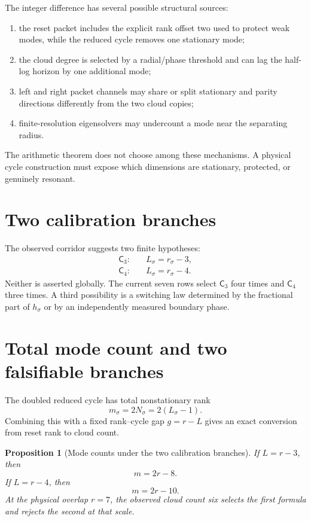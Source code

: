 \documentclass[12pt]{article}
\newtheorem{proposition}[theorem]{Proposition}
\theoremstyle{remark}
\begin{document}
The integer difference has several possible structural sources:
\begin{enumerate}[leftmargin=2em]
\item the reset packet includes the explicit rank offset two used to protect
weak modes, while the reduced cycle removes one stationary mode;
\item the cloud degree is selected by a radial/phase threshold and can lag the
half-log horizon by one additional mode;
\item left and right packet channels may share or split stationary and parity
directions differently from the two cloud copies;
\item finite-resolution eigensolvers may undercount a mode near the separating
radius.
\end{enumerate}
The arithmetic theorem does not choose among these mechanisms.  A physical
cycle construction must expose which dimensions are stationary, protected,
or genuinely resonant.

\section{Two calibration branches}

The observed corridor suggests two finite hypotheses:
\begin{align}
 \mathsf C_3:&\quad L_\sigma=r_\sigma-3,
 \label{eq:c3}\\
 \mathsf C_4:&\quad L_\sigma=r_\sigma-4.
 \label{eq:c4}
\end{align}
Neither is asserted globally.  The current seven rows select $\mathsf C_3$
four times and $\mathsf C_4$ three times.  A third possibility is a switching
law determined by the fractional part of $h_\sigma$ or by an independently
measured boundary phase.

\section{Total mode count and two falsifiable branches}

The doubled reduced cycle has total nonstationary rank
\begin{equation}\label{eq:mode-count}
 m_\sigma=2N_\sigma=2(L_\sigma-1).
\end{equation}
Combining this with a fixed rank--cycle gap $g=r-L$ gives an exact conversion
from reset rank to cloud count.

\begin{proposition}[Mode counts under the two calibration branches]
\label{prop:mode-branches}
If $L=r-3$, then
\begin{equation}\label{eq:m3}
 m=2r-8.
\end{equation}
If $L=r-4$, then
\begin{equation}\label{eq:m4}
 m=2r-10.
\end{equation}
At the physical overlap $r=7$, the observed cloud count six selects the first
formula and rejects the second at that scale.
\end{proposition}
\end{document}
